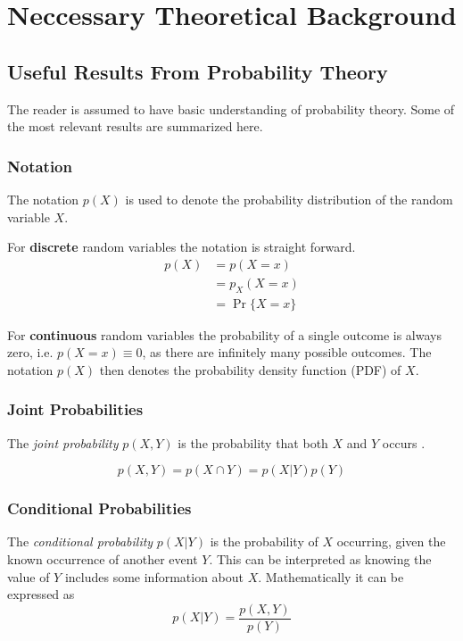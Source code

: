 \chapter{Neccessary Theoretical Background}

\section{Useful Results From Probability Theory}

The reader is assumed to have basic understanding of probability theory. Some of the most relevant results are summarized here.
 
 \subsection{Notation}
 
 The notation $p(X)$ is used to denote the probability distribution of the random variable $X$.
 
 For \textbf{discrete} random variables the notation is straight forward. 
 \begin{align*}
 p(X) &= p(X=x)\\  &= p_X(X=x)\\ &= \Pr\{X = x\}
 \end{align*}
 
 For \textbf{continuous} random variables the probability of a single outcome is always zero, i.e. $p(X = x) \equiv 0$, as there are infinitely many possible outcomes. The notation $p(X)$ then denotes the probability density function (PDF) of $X$. 
 
 
 
\subsection{Joint Probabilities}
The \textit{joint probability} $p(X, Y)$ is the probability that both $X$ and $Y$ occurs \cite[p.~29]{murphy}.

\begin{equation}
    p(X, Y) = p(X \cap Y) = p(X | Y)p(Y)
\end{equation}

\subsection{Conditional Probabilities}
The \textit{conditional probability} $p(X | Y)$ is the probability of $X$ occurring, given the known occurrence of another event $Y$. This can be interpreted as knowing the value of $Y$ includes some information about $X$. Mathematically it can be expressed as \cite[p.~29]{murphy}
\begin{equation}\label{eq:conditional_probability}
    p(X | Y) = \frac{p(X, Y)}{p(Y)}
\end{equation}

